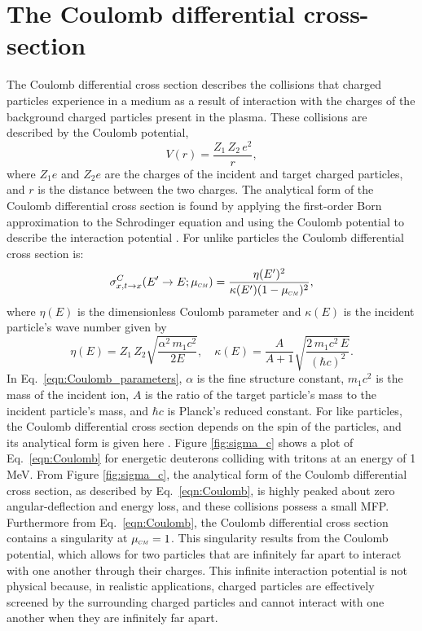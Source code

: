 \documentclass[../main.tex]{subfiles}
\begin{document}
\section{The Coulomb differential cross-section}
The Coulomb differential cross section describes the collisions that charged particles experience in a medium as a result of interaction with the charges of the background charged particles present in the plasma. These collisions are described by the Coulomb potential,
\begin{equation} \label{eqn:Coulomb_potential}
    V(r) = \dfrac{Z_1 \, Z_2 \, e^2}{r},
\end{equation}
where $Z_1 e$ and $Z_2 e$ are the charges of the incident and target charged particles, and $r$ is the distance between the two charges. The analytical form of the Coulomb differential cross section is found by applying the first-order Born approximation to the Schrodinger equation and using the Coulomb potential to describe the interaction potential \cite{Devaney-1971}. For unlike particles the Coulomb differential cross section is:
\begin{equation} \label{eqn:Coulomb}
    \sigma_{x,t \rightarrow x}^C(E^{\prime}\rightarrow E; \mucm) = \dfrac{\eta(E^{\prime})^2}{\kappa(E^{\prime}) (1 - \mucm)^2},
\end{equation}
where $\eta(E)$ is the dimensionless Coulomb parameter and $\kappa(E)$ is the incident particle's wave number given by
\begin{equation} \label{eqn:Coulomb_parameters}
    \eta(E) = Z_1 \, Z_2 \sqrt{\frac{\alpha^2 \, m_1 c^2}{2E}}, \quad 
    \kappa(E) = \dfrac{A}{A+1} \sqrt{\frac{2 \, m_1c^2 \, E}{(\hbar c)^2}}.
\end{equation}
In Eq.~\eqref{eqn:Coulomb_parameters}, $\alpha$ is the fine structure constant, $m_1 c^2$ is the mass of the incident ion, $A$ is the ratio of the target particle's mass to the incident particle's mass, and $\hbar c$ is Planck's reduced constant. For like particles, the Coulomb differential cross section depends on the spin of the particles, and its analytical form is given here \cite{Hale-1983}. Figure \ref{fig:sigma_c} shows a plot of Eq.~\eqref{eqn:Coulomb} for energetic deuterons colliding with tritons at an energy of 1 MeV. From Figure \ref{fig:sigma_c}, the analytical form of the Coulomb differential cross section, as described by Eq.~\eqref{eqn:Coulomb}, is highly peaked about zero angular-deflection and energy loss, and these collisions possess a small MFP. Furthermore from Eq.~\eqref{eqn:Coulomb}, the Coulomb differential cross section contains a singularity at $\mucm = 1$. This singularity results from the Coulomb potential, which allows for two particles that are infinitely far apart to interact with one another through their charges. This infinite interaction potential is not physical because, in realistic applications, charged particles are effectively screened by the surrounding charged particles and cannot interact with one another when they are infinitely far apart.
\end{document}
